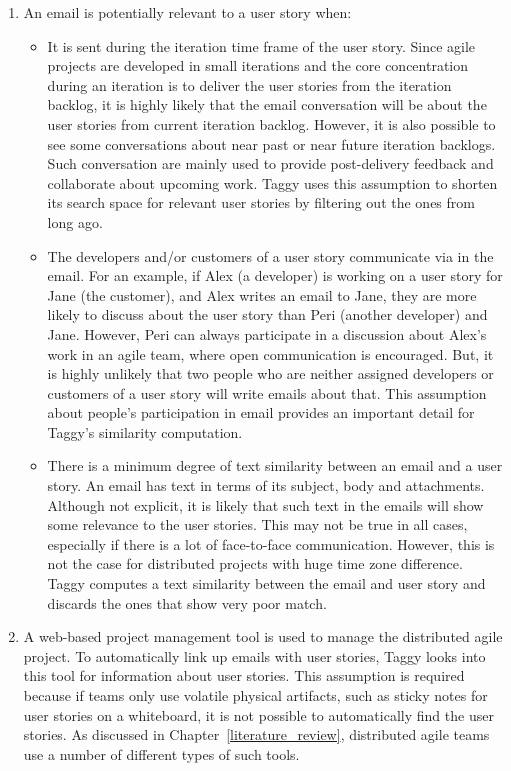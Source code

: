 \begin{enumerate}
	\item An email is potentially relevant to a user story when:
		\begin{itemize}
			\item It is sent during the iteration time frame of the user story. Since agile projects are developed in small iterations and the core concentration during an iteration is to deliver the user stories from the iteration backlog, it is highly likely that the email conversation will be about the user stories from current iteration backlog. However, it is also possible to see some conversations about near past or near future iteration backlogs. Such conversation are mainly used to provide post-delivery feedback and collaborate about upcoming work. Taggy uses this assumption to shorten its search space for relevant user stories by filtering out the ones from long ago.
			
			\item The developers and/or customers of a user story communicate via in the email. For an example, if Alex (a developer) is working on a user story for Jane (the customer), and Alex writes an email to Jane, they are more likely to discuss about the user story than Peri (another developer) and Jane. However, Peri can always participate in a discussion about Alex's work in an agile team, where open communication is encouraged. But, it is highly unlikely that two people who are neither assigned developers or customers of a user story will write emails about that. This assumption about people's participation in email provides an important detail for Taggy's similarity computation.
			
			\item There is a minimum degree of text similarity between an email and a user story. An email has text in terms of its subject, body and attachments. Although not explicit, it is likely that such text in the emails will show some relevance to the user stories. This may not be true in all cases, especially if there is a lot of face-to-face communication. However, this is not the case for distributed projects with huge time zone difference. Taggy computes a text similarity between the email and user story and discards the ones that show very poor match.
		\end{itemize}
	 \item A web-based project management tool is used to manage the distributed agile project. To automatically link up emails with user stories, Taggy looks into this tool for information about user stories. This assumption is required because if teams only use volatile physical artifacts, such as sticky notes for user stories on a whiteboard, it is not possible to automatically find the user stories. As discussed in Chapter~\ref{literature_review}, distributed agile teams use a number of different types of such tools.
	

\end{enumerate}
